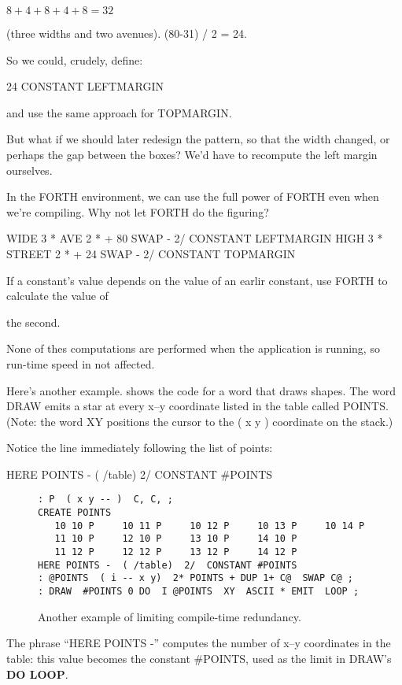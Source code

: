 \medskip

$8 + 4 + 8 + 4 + 8 = 32$

\medskip

\noindent
(three widths and two avenues). (80-31) / 2 = 24.

So we could, crudely, define:

\begin{Code}
24 CONSTANT LEFTMARGIN
\end{Code}
and use the same approach for TOPMARGIN.

But what if we should later redesign the pattern, so that the width changed, or perhaps the gap between the boxes? We'd have to recompute the left margin ourselves.

In the FORTH environment, we can use the full power of FORTH even when we're compiling. Why not let FORTH do the figuring?

\begin{Code}
WIDE 3 *  AVE 2 *  +  80 SWAP -  2/ CONSTANT LEFTMARGIN
HIGH 3 *  STREET 2 * +  24 SWAP -  2/ CONSTANT TOPMARGIN
\end{Code}

\begin{tip}
If a constant's value depends on the value of an earlir constant, use FORTH to calculate the value of

the second.
\end{tip}
None of thes computations are performed when the application is running, so run-time speed in not affected.

Here's another example.  shows the code for a word that draws shapes. The word DRAW emits a star at every x--y coordinate listed in the table called POINTS. (Note: the word XY positions the cursor to the ( x y ) coordinate on the stack.)

Notice the line immediately following the list of points:

\begin{Code}
HERE POINTS -  ( /table)  2/  CONSTANT #POINTS
\end{Code}
\begin{figure*}[tttt]
\caption{Another example of limiting compile-time redundancy.}
\begin{center}
\begin{BVerbatim}
: P  ( x y -- )  C, C, ;
CREATE POINTS
   10 10 P     10 11 P     10 12 P     10 13 P     10 14 P
   11 10 P     12 10 P     13 10 P     14 10 P
   11 12 P     12 12 P     13 12 P     14 12 P
HERE POINTS -  ( /table)  2/  CONSTANT #POINTS
: @POINTS  ( i -- x y)  2* POINTS + DUP 1+ C@  SWAP C@ ;
: DRAW  #POINTS 0 DO  I @POINTS  XY  ASCII * EMIT  LOOP ;
\end{BVerbatim}
\end{center}
\end{figure*}
The phrase ``HERE POINTS -'' computes the number of x--y coordinates in the table: this value becomes the constant \#POINTS, used as the limit in DRAW's \textbf{DO LOOP}.

